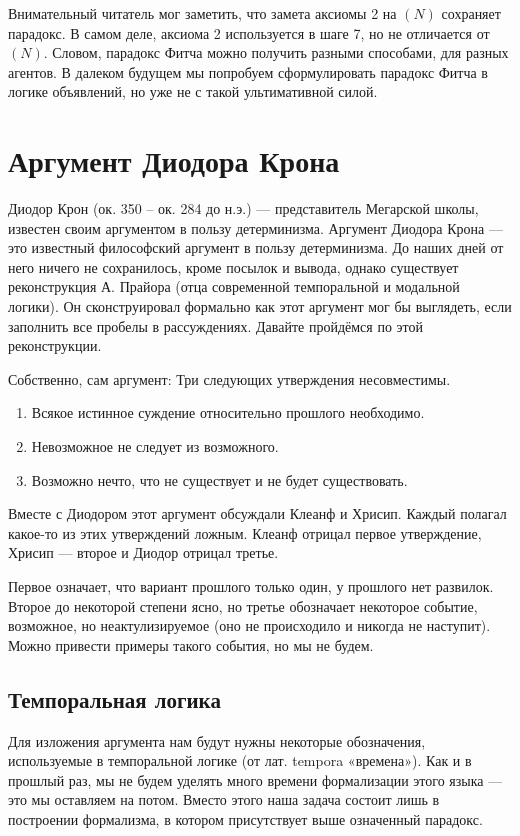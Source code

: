 \documentclass[openany]{book}
\theoremstyle{plain}
\theoremstyle{definition}
\begin{document}
Внимательный читатель мог заметить, что замета аксиомы 2 на \((N)\) сохраняет парадокс. В самом деле, аксиома 2 используется в шаге 7, но не отличается от \((N)\). Словом, парадокс Фитча можно получить разными способами, для разных агентов. В далеком будущем мы попробуем сформулировать парадокс Фитча в логике объявлений, но уже не с такой ультимативной силой.

\section{ Аргумент Диодора Крона }

Диодор Крон (ок. 350 -- ок. 284 до н.э.) --- представитель Мегарской школы, известен своим аргументом в пользу детерминизма. Аргумент Диодора Крона --- это известный философский аргумент в пользу детерминизма. До наших дней от него ничего не сохранилось, кроме посылок и вывода, однако существует реконструкция А. Прайора (отца современной темпоральной и модальной логики). Он сконструировал формально как этот аргумент мог бы выглядеть, если заполнить все пробелы в рассуждениях. Давайте пройдёмся по этой реконструкции.

Собственно, сам аргумент:
Три следующих утверждения несовместимы.
\begin{enumerate}
    \item Всякое истинное суждение относительно прошлого необходимо.
    \item Невозможное не следует из возможного.
    \item Возможно нечто, что не существует и не будет существовать.
\end{enumerate}

Вместе с Диодором этот аргумент обсуждали Клеанф и Хрисип. Каждый полагал какое-то из этих утверждений ложным. Клеанф отрицал первое утверждение, Хрисип --- второе и Диодор отрицал третье.

Первое означает, что вариант прошлого только один, у прошлого нет развилок. Второе до некоторой степени ясно, но третье обозначает некоторое событие, возможное, но неактулизируемое (оно не происходило и никогда не наступит). Можно привести примеры такого события, но мы не будем.

\subsection{ Темпоральная логика }

Для изложения аргумента нам будут нужны некоторые обозначения, используемые в темпоральной логике (от лат. tempora «времена»). Как и в прошлый раз, мы не будем уделять много времени формализации этого языка — это мы оставляем на потом. Вместо этого наша задача состоит лишь в построении формализма, в котором присутствует выше означенный парадокс.
\end{document}
